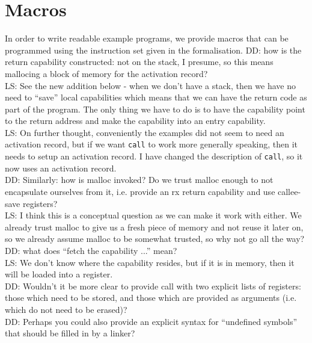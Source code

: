 \documentclass[a4paper]{article}
\newcommand\lau[1]{{\color{purple} \sf \footnotesize {LS: #1}}\\}
\newcommand\dominique[1]{{\color{purple} \sf \footnotesize {DD: #1}}\\}
\begin{document}
\section{Macros}
In order to write readable example programs, we provide macros that can be programmed using the instruction set given in the formalisation.
\dominique{how is the return capability constructed: not on the stack, I presume, so this means mallocing a block of memory for the activation record?}
\lau{See the new addition below - when we don't have a stack, then we have no need to ``save'' local capabilities which means that we can have the return code as part of the program. The only thing we have to do is to have the capability point to the return address and make the capability into an entry capability. }
\lau{On further thought, conveniently the examples did not seem to need an activation record, but if we want \texttt{call} to work more generally speaking, then it needs to setup an activation record. I have changed the description of \texttt{call}, so it now uses an activation record. }
\dominique{Similarly: how is malloc invoked?  Do we trust malloc enough to not encapsulate ourselves from it, i.e. provide an rx return capability and use callee-save registers?}
\lau{ I think this is a conceptual question as we can make it work with either. We already trust malloc to give us a fresh piece of memory and not reuse it later on, so we already assume malloc to be somewhat trusted, so why not go all the way? }
\dominique{what does ``fetch the capability ...'' mean?}
\lau{ We don't know where the capability resides, but if it is in memory, then it will be loaded into a register. }
\dominique{Wouldn't it be more clear to provide call with two explicit lists of registers: those which need to be stored, and those which are provided as arguments (i.e. which do not need to be erased)?}
\dominique{Perhaps you could also provide an explicit syntax for ``undefined symbols'' that should be filled in by a linker?}
\end{document}

